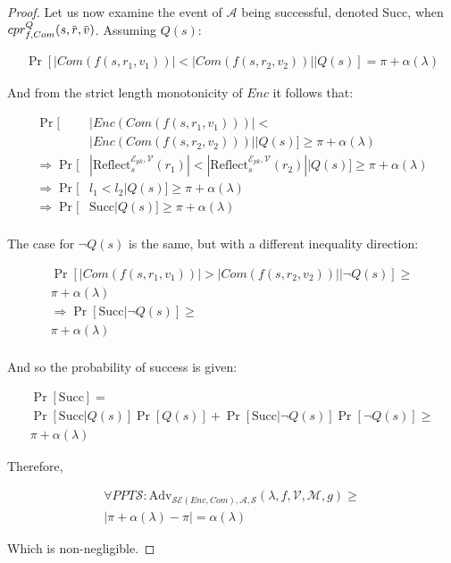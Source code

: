 \documentclass{sig-alternate-05-2015}
\newcommand{\overbar}[1]{\mkern 1.5mu\overline{\mkern-1.5mu#1\mkern-1.5mu}\mkern 1.5mu}
\begin{document}
\begin{proof}
Let us now examine the event of $\mathcal{A}$ being successful, denoted Succ,
when $cpr^Q_{f, Com}(s, \overbar{r}, \overbar{v})$. Assuming $Q(s)$:

\begin{align*}
    \Pr[|Com(f(s, r_1, v_1))| < |Com(f(s, r_2, v_2))||Q(s)]
    = \pi + \alpha(\lambda)
\end{align*}

And from the strict length monotonicity of $Enc$ it follows that:

\begin{align*}
    \Pr[&|Enc(Com(f(s, r_1, v_1)))| <\\&|Enc(Com(f(s, r_2, v_2)))||Q(s)]
        \geq \pi + \alpha(\lambda)\\
    \Rightarrow \Pr[&
        |\text{Reflect}^{\mathcal{E}_{pk}, \mathcal{V}}_s(r_1)|
        <
        |\text{Reflect}^{\mathcal{E}_{pk}, \mathcal{V}}_s(r_2)||Q(s)
    ]
        \geq \pi + \alpha(\lambda)\\
    \Rightarrow \Pr[&l_1 < l_2|Q(s)]
        \geq \pi + \alpha(\lambda)\\
    \Rightarrow \Pr[&\text{Succ}|Q(s)]
        \geq \pi + \alpha(\lambda)\\
\end{align*}

The case for $\lnot Q(s)$ is the same, but with a different inequality direction:

\begin{align*}
    \Pr[|Com(f(s, r_1, v_1))| > |Com(f(s, r_2, v_2))||\lnot Q(s)]
        \geq\\
        \pi + \alpha(\lambda)\\
    \Rightarrow \Pr[\text{Succ}|\lnot Q(s)] \geq\\
    \pi + \alpha(\lambda)\\
\end{align*}

And so the probability of success is given:

\begin{align*}
    \Pr[\text{Succ}] =\\
    \Pr[\text{Succ}|Q(s)]\Pr[Q(s)]
    +
    \Pr[\text{Succ}|\lnot Q(s)]\Pr[\lnot Q(s)] \geq\\
    \pi + \alpha(\lambda)
\end{align*}

Therefore,

\begin{align*}
    \forall PPT \mathcal{S}:
    \text{Adv}_{\mathcal{SE}(Enc, Com), \mathcal{A}, \mathcal{S}}
        (\lambda, f, \mathcal{V}, \mathcal{M}, g)
    \geq\\
    |\pi + \alpha(\lambda) - \pi| = \alpha(\lambda)
\end{align*}

Which is non-negligible.

\end{proof}
\end{document}
